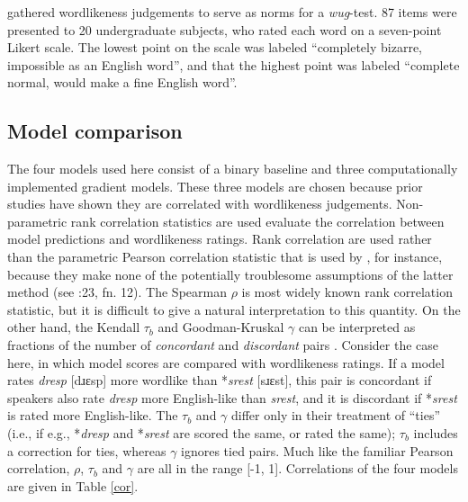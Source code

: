 \subsubsection{\citealt{Albright2003b}}

\citet{Albright2003b} gathered wordlikeness judgements to serve as norms for a \emph{wug}-test. 87 items were presented to 20 undergraduate subjects, who rated each word on a seven-point Likert scale. The lowest point on the scale was labeled ``completely bizarre, impossible as an English word'', and that the highest point was labeled ``complete normal, would make a fine English word''.

\subsection{Model comparison}

The four models used here consist of a binary baseline and three computationally implemented gradient models. These three models are chosen because prior studies have shown they are correlated with wordlikeness judgements. Non-parametric rank correlation statistics are used evaluate the correlation between model predictions and wordlikeness ratings. Rank correlation are used rather than the parametric Pearson correlation statistic that is used by \citet{Hayes2008a}, for instance, because they make none of the potentially troublesome assumptions of the latter method (see \citealt{Albright2009a}:23, fn. 12). The Spearman $\rho$ is most widely known rank correlation statistic, but it is difficult to give a natural interpretation to this quantity. On the other hand, the Kendall $\tau_b$ and Goodman-Kruskal $\gamma$ can be interpreted as fractions of the number of \emph{concordant} and \emph{discordant} pairs \citep{Noether1981}. Consider the case here, in which model scores are compared with wordlikeness ratings. If a model rates \emph{dresp} [dɹɛsp] more wordlike than *\emph{srest} [sɹɛst], this pair is concordant if speakers also rate \emph{dresp} more English-like than \emph{srest}, and it is discordant if *\emph{srest} is rated more English-like. The $\tau_b$ and $\gamma$ differ only in their treatment of ``ties'' (i.e., if e.g., *\emph{dresp} and *\emph{srest} are scored the same, or rated the same); $\tau_b$ includes a correction for ties, whereas $\gamma$ ignores tied pairs. Much like the familiar Pearson correlation, $\rho$, $\tau_b$ and $\gamma$ are all in the range [-1, 1]. Correlations of the four models are given in Table \ref{cor}.

